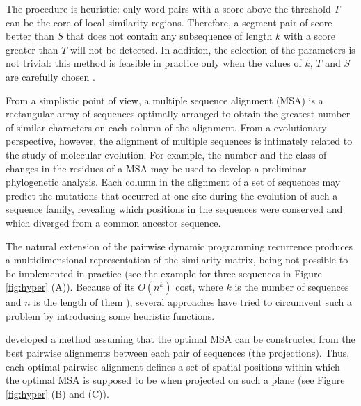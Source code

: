 The procedure is heuristic: only word pairs with a score above the threshold $T$ can be the core of
local similarity regions. Therefore, a segment pair of score better than $S$ that does not contain any 
subsequence of length $k$ with a score greater than $T$ will not be detected. In addition, the selection
of the parameters is not trivial: this method is feasible in practice only when the values of $k$, $T$ 
and $S$ are carefully chosen \citep{altschul:1990a,myers:1991a}.



\label{sec:msa}

From a simplistic point of view, a multiple sequence alignment (MSA) is a rectangular 
array of sequences optimally arranged to obtain the greatest number of similar 
characters on each column of the alignment. From a evolutionary perspective, however, 
the alignment of multiple sequences is intimately related to the study of molecular 
evolution. For example, the number and the class of changes in the residues of a MSA may 
be used to develop a preliminar phylogenetic analysis. Each column in the alignment 
of a set of sequences may predict the mutations that occurred at one site during the 
evolution of such a sequence family, revealing which positions in the sequences were 
conserved and which diverged from a common ancestor sequence. 

The natural extension of the pairwise dynamic programming recurrence produces
a multidimensional representation of the similarity matrix, being not possible
to be implemented in practice (see the example for three sequences in 
Figure \ref{fig:hyper} (A)). Because of its $O(n^k)$ cost, where $k$ is the number 
of sequences and $n$ is the length of them \citep{waterman:1976a}), several 
approaches have tried to circumvent such a problem by introducing some heuristic 
functions. 

\citet{carrillo:1988a}
 
developed a method assuming that the optimal MSA can
be constructed from the best pairwise alignments between each pair of
sequences (the projections). Thus, each optimal pairwise alignment defines a set 
of spatial positions within which the optimal MSA is supposed to be when projected 
on such a plane (see Figure \ref{fig:hyper} (B) and (C)).

